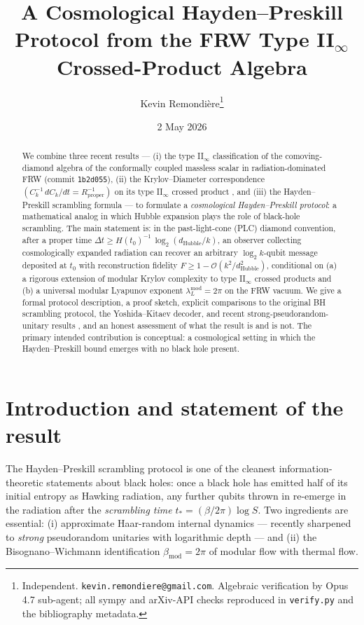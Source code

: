\documentclass[11pt]{article}
\title{A Cosmological Hayden--Preskill Protocol from the FRW
       Type II$_\infty$ Crossed-Product Algebra}
\author{Kevin Remondi\`ere\thanks{Independent.
        \texttt{kevin.remondiere@gmail.com}.
        Algebraic verification by Opus 4.7 sub-agent;
        all sympy and arXiv-API checks reproduced in
        \texttt{verify.py} and the bibliography metadata.}}
\date{2 May 2026}
\theoremstyle{definition}
\theoremstyle{remark}
\newcommand{\OO}{\mathcal{O}}
\begin{document}
\maketitle

\begin{abstract}
We combine three recent results --- (i) the type II$_\infty$ classification
of the comoving-diamond algebra of the conformally coupled massless scalar
in radiation-dominated FRW \cite{frwnote} (commit \texttt{1b2d055}),
(ii) the Krylov--Diameter correspondence
$(C_k^{-1}\,dC_k/dt = R_{\mathrm{proper}}^{-1})$ on its type II$_\infty$
crossed product \cite{piste1note},
and (iii) the Hayden--Preskill scrambling formula \cite{HaydenPreskill07}
--- to formulate a \emph{cosmological Hayden--Preskill protocol}: a
mathematical analog in which Hubble expansion plays the role of black-hole
scrambling. The main statement is:
in the past-light-cone (PLC) diamond convention, after a proper time
$\Delta t \ge H(t_0)^{-1}\,\log_2(d_{\mathrm{Hubble}}/k)$, an observer
collecting cosmologically expanded radiation can recover an arbitrary
$\log_2 k$-qubit message deposited at $t_0$ with reconstruction fidelity
$F\ge 1-\OO(k^2/d_{\mathrm{Hubble}}^2)$, conditional on (a) a rigorous
extension of modular Krylov complexity to type II$_\infty$ crossed products
and (b) a universal modular Lyapunov exponent $\lambda_L^{\mathrm{mod}}=2\pi$
on the FRW vacuum. We give a formal protocol description, a proof sketch,
explicit comparisons to the original BH scrambling protocol, the
Yoshida--Kitaev decoder, and recent strong-pseudorandom-unitary results
\cite{ChenBouland24,Schuster25}, and an honest assessment of what the
result is and is not. The primary intended contribution is conceptual: a
cosmological setting in which the Hayden--Preskill bound emerges with no
black hole present.
\end{abstract}

\tableofcontents

\section{Introduction and statement of the result}

The Hayden--Preskill scrambling protocol \cite{HaydenPreskill07} is one of
the cleanest information-theoretic statements about black holes: once a
black hole has emitted half of its initial entropy as Hawking radiation,
any further qubits thrown in re-emerge in the radiation after the
\emph{scrambling time} $t_*=(\beta/2\pi)\log S$. Two ingredients are
essential: (i) approximate Haar-random internal dynamics --- recently
sharpened to \emph{strong} pseudorandom unitaries with logarithmic depth
\cite{Schuster25,ChenBouland24} --- and (ii) the Bisognano--Wichmann
identification $\beta_{\mathrm{mod}}=2\pi$ of modular flow with thermal
flow.
\end{document}
